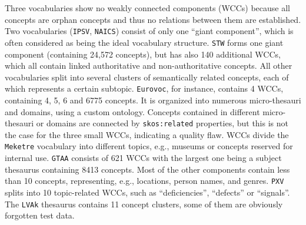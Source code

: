 
Three vocabularies show no weakly connected components (WCCs) because all concepts are orphan concepts and thus no relations between them are established. Two vocabularies (\texttt{IPSV}, \texttt{NAICS}) consist of only one ``giant component'', which is often considered as being the ideal vocabulary structure. \texttt{STW} forms one giant component (containing 24,572 concepts), but has also 140 additional WCCs, which all contain linked authoritative and non-authoritative concepts. All other vocabularies split into several clusters of semantically related concepts, each of which represents a certain subtopic. \texttt{Eurovoc}, for instance, contains 4 WCCs, containing 4, 5, 6 and 6775 concepts. 
It is organized into numerous micro-thesauri and domains, using a custom ontology. Concepts contained in different micro-thesauri or domains are connected by \texttt{skos:related} properties, but this is not the case for the three small WCCs, indicating a quality flaw. WCCs divide the \texttt{Meketre} vocabulary into different topics, e.g., museums or concepts reserved for internal use. \texttt{GTAA} consists of 621 WCCs with the largest one being a subject thesaurus containing 8413 concepts. Most of the other components contain less than 10 concepts, representing, e.g., locations, person names, and genres. \texttt{PXV} splits into 10 topic-related WCCs, such as ``deficiencies'', ``defects'' or ``signals''. The \texttt{LVAk} thesaurus contains 11 concept clusters, some of them are obviously forgotten test data. 

